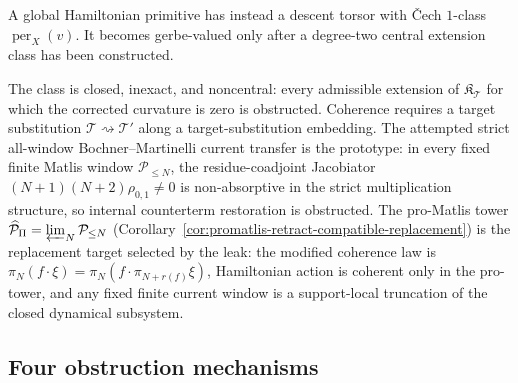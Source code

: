 \begin{description}
\[\]
A global
Hamiltonian primitive has instead a descent torsor with Čech
\(1\)-class \(\operatorname{per}_X(v)\).  It becomes gerbe-valued only
after a degree-two central extension class has been constructed.
\item[Target-replacement twist.]  The class is closed, inexact, and
noncentral: every admissible extension of
\(\mathfrak K_{\mathcal T}\) for which the corrected curvature is
zero is obstructed.  Coherence requires a target substitution
\(\mathcal T\rightsquigarrow\mathcal T'\) along a target-substitution
embedding.  The attempted strict all-window Bochner--Martinelli
current transfer is the prototype: in every fixed finite Matlis window
\(\mathcal P_{\le N}\), the residue-coadjoint Jacobiator
\((N+1)(N+2)\rho_{0,1}\ne 0\) is non-absorptive in the strict
multiplication structure, so internal counterterm restoration is
obstructed.  The pro-Matlis tower
\(\widehat{\mathcal P}_\Pi=\varprojlim_N\mathcal P_{\le N}\)
(Corollary~\ref{cor:promatlis-retract-compatible-replacement}) is the replacement
target selected by the leak: the modified coherence law is
\(\pi_N(f\cdot\xi)=\pi_N(f\cdot\pi_{N+r(f)}\xi)\), Hamiltonian action
is coherent only in the pro-tower, and any fixed finite current
window is a support-local truncation of the closed dynamical subsystem.
\end{description}

\subsection{Four obstruction mechanisms}\label{ssec:master-deformation-dichotomy}

